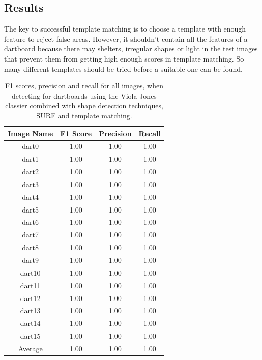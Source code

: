 \documentclass[conference]{IEEEtran}
\begin{document}
\subsection{Results}
The key to successful template matching is to choose a template with enough feature to reject false areas. However, it shouldn't contain all the features of a dartboard because there may shelters, irregular shapes or light in the test images that prevent them from getting high enough scores in template matching. So many different templates should be tried before a suitable one can be found.\par
\begin{table}[htp]
\caption{F1 scores, precision and recall for all images, when detecting for dartboards using the Viola-Jones classier combined with shape detection techniques, SURF and template matching. }
\begin{center}
\begin{tabular}{||c|c|c|c||}
\hline
Image Name		 	& F1 Score 	& Precision	& Recall            \\ \hline
dart0					& 1.00		&	1.00		& 1.00		\\
dart1					& 1.00		&	1.00		& 1.00		\\
dart2					& 1.00		&	1.00		& 1.00		\\
dart3					& 1.00		&	1.00		& 1.00		\\
dart4					& 1.00		&	1.00		& 1.00		\\
dart5					& 1.00		&	1.00		& 1.00		\\
dart6					& 1.00		&	1.00		& 1.00		\\
dart7					& 1.00		&	1.00		& 1.00		\\
dart8					& 1.00		&	1.00		& 1.00		\\
dart9					& 1.00		&	1.00		& 1.00		\\
dart10				& 1.00		&	1.00		& 1.00		\\
dart11				& 1.00		&	1.00		& 1.00		\\
dart12				& 1.00		&	1.00		& 1.00		\\
dart13				& 1.00		&	1.00		& 1.00		\\
dart14				& 1.00		&	1.00		& 1.00		\\
dart15				& 1.00		&	1.00		& 1.00		\\ \hline
Average 		 		& 1.00		&	1.00		& 1.00 		\\ \hline
\end{tabular}
\end{center}
\label{default}
\end{table}
\end{document}
